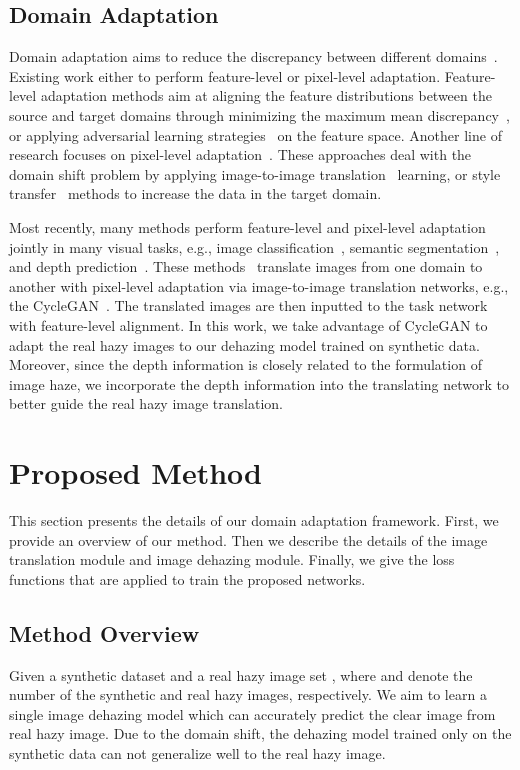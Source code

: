 \documentclass[10pt,twocolumn,letterpaper]{article}
\begin{document}
\subsection{Domain Adaptation}
Domain adaptation aims to reduce the discrepancy between different domains~\cite{atapour2018real,chen2018domain,long2013transfer}. 
Existing work either to perform feature-level or pixel-level adaptation.
Feature-level adaptation methods aim at aligning the feature distributions between the source and target domains through minimizing the maximum mean discrepancy~\cite{long2015learning}, or applying adversarial learning strategies~\cite{tzeng2017adversarial,tsai2018learning} on the feature space.
Another line of research focuses on pixel-level adaptation~\cite{bousmalis2017unsupervised, shrivastava2017learning, dundar2018domain}. 
These approaches deal with the domain shift problem by applying image-to-image translation~\cite{bousmalis2017unsupervised, shrivastava2017learning} learning, or style transfer~\cite{dundar2018domain} methods to increase the data in the target domain.
 
Most recently, many methods perform feature-level and pixel-level adaptation jointly in many visual tasks, e.g.,  image classification~\cite{hoffman2017cycada}, semantic segmentation~\cite{chen2019learning}, and depth prediction~\cite{zheng2018t2net}. 
These methods~\cite{chen2019learning,zheng2018t2net} translate images from one domain to another with pixel-level adaptation via image-to-image translation networks, e.g., the CycleGAN~\cite{zhu2017unpaired}.
The translated images are then inputted to the task network with feature-level alignment.
In this work, we take advantage of CycleGAN to adapt the real hazy images to our dehazing model trained on synthetic data. 
Moreover, since the depth information is closely related to the formulation of image haze, we incorporate the depth information into the translating network to better guide the real hazy image translation. 


\section{Proposed Method}
This section presents the details of our domain adaptation framework.
First, we provide an overview of our method. 
Then we describe the details of the image translation module and image dehazing module.
Finally, we give the loss functions that are applied to train the proposed networks.


\subsection{Method Overview}
Given a synthetic dataset  and a real hazy image set , where  and  denote the number of the synthetic and real hazy images, respectively.
We aim to learn a single image dehazing model which can accurately predict the clear image from real hazy image. 
Due to the domain shift, the dehazing model trained only on the synthetic data can not generalize well to the real hazy image. 
\end{document}
